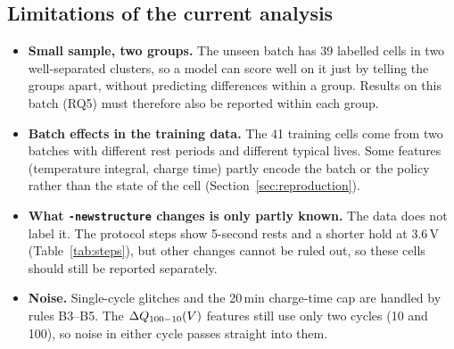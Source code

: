 \subsection{Limitations of the current analysis}
\begin{itemize}
  \item \textbf{Small sample, two groups.} The unseen batch has 39 labelled
  cells in two well-separated clusters, so a model can score well on it just
  by telling the groups apart, without predicting differences within a
  group. Results on this batch (RQ5) must therefore also be reported within
  each group.
  \item \textbf{Batch effects in the training data.} The 41 training cells
  come from two batches with different rest periods and different typical
  lives. Some features (temperature integral, charge time) partly encode the
  batch or the policy rather than the state of the cell
  (Section~\ref{sec:reproduction}).
  \item \textbf{What \texttt{-newstructure} changes is only partly known.}
  The data does not label it. The protocol steps show 5-second rests and a
  shorter hold at 3.6\,V (Table~\ref{tab:steps}), but other changes cannot be
  ruled out, so these cells should still be reported separately.
  \item \textbf{Noise.} Single-cycle glitches and the 20\,min charge-time
  cap are handled by rules B3--B5. The $\Delta Q_{100-10}(V)$ features still use only two
  cycles (10 and 100), so noise in either cycle passes straight into
  them.
\end{itemize}
